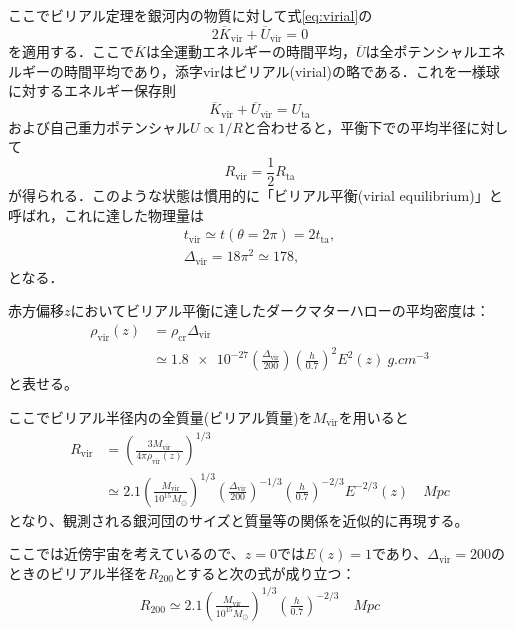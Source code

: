 ここでビリアル定理を銀河内の物質に対して式\eqref{eq:virial}の
\begin{equation}
	2 \overline{K}_\text{vir} + \overline{U}_\text{vir} = 0
\end{equation}
を適用する．ここで$\overline{K}$は全運動エネルギーの時間平均，$\overline{U}$は全ポテンシャルエネルギーの時間平均であり，添字virはビリアル(virial)の略である．これを一様球に対するエネルギー保存則
\begin{equation}
	\overline{K}_\text{vir} + \overline{U}_\text{vir} = U_\text{ta}
\end{equation}
および自己重力ポテンシャル$U \propto 1/R$と合わせると，平衡下での平均半径に対して
\begin{equation}
	R_\text{vir} = \frac{1}{2}R_\text{ta}
\end{equation}
が得られる．このような状態は慣用的に「ビリアル平衡(virial equilibrium)」と呼ばれ，これに達した物理量は
\begin{align}
	t_\text{vir} \simeq t(\theta = 2\pi) = 2t_\text{ta},\\
	\Delta_\text{vir} = 18 \pi^2 \simeq 178,
\end{align}
となる．

赤方偏移$z$においてビリアル平衡に達したダークマターハローの平均密度は：
\begin{align}
	\rho_\text{vir}(z) &= \rho_\text{cr} \Delta_\text{vir} \\
	&\simeq \num{1.8e-27} \left( \frac{\Delta_\text{vir}}{200}\right) \left(\frac{h}{0.7}\right)^2 E^2(z) \ \si{g. cm^{-3}}
\end{align}
と表せる。

ここでビリアル半径内の全質量(ビリアル質量)を$M_\text{vir}$を用いると
\begin{align}
	R_\text{vir} &= \left( \frac{3 M_\text{vir}}{4 \pi \rho_\text{vir}(z)} \right)^{1/3} \\
	&\simeq 2.1 \left( \frac{M_\text{vir}}{10^{15} M_\odot} \right)^{1/3} \left( \frac{\Delta_\text{vir}}{200} \right)^{-1/3} \left( \frac{h}{0.7} \right)^{-2/3} E^{-2/3}(z) \quad \si{Mpc}
\end{align}
となり、観測される銀河団のサイズと質量等の関係を近似的に再現する。

ここでは近傍宇宙を考えているので、$z=0$では$E(z) = 1$であり、$\Delta_\text{vir} = 200$のときのビリアル半径を$R_{200}$とすると次の式が成り立つ：
\begin{align}
	R_{200} \simeq 2.1 \left( \frac{M_\text{vir}}{10^{15} M_\odot} \right)^{1/3} \left( \frac{h}{0.7} \right)^{-2/3} \quad \si{Mpc}　\label{eq:r200}
\end{align}

